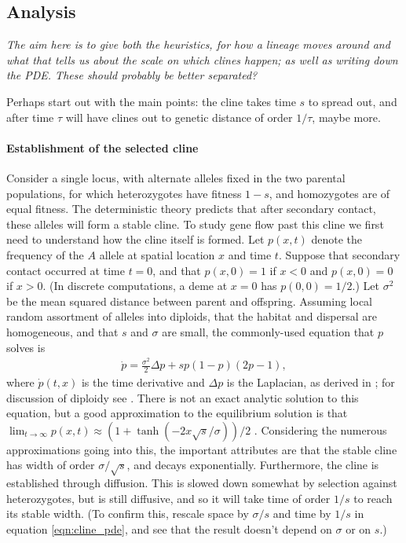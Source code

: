 \documentclass[12pt]{article}
\newcommand{\plr}[1]{{\em \color{blue} #1}}
\begin{document}
\subsection*{Analysis}

\plr{The aim here is to give both the heuristics, for how a lineage moves around
and what that tells us about the scale on which clines happen;
as well as writing down the PDE.  These should probably be better separated?}

Perhaps start out with the main points:
the cline takes time $s$ to spread out,
and after time $\tau$ will have clines out to genetic distance of order $1/\tau$,
maybe more.

\paragraph{Establishment of the selected cline}
Consider a single locus, with alternate alleles fixed in the two parental populations,
for which heterozygotes have fitness $1-s$, and homozygotes are of equal fitness.
The deterministic theory predicts that after secondary contact,
these alleles will form a stable cline.
To study gene flow past this cline we first need to understand how the cline itself is formed.
Let $p(x,t)$ denote the frequency of the $A$ allele at spatial location $x$ and time $t$.  
Suppose that secondary contact occurred at time $t=0$, 
and that $p(x,0) = 1$ if $x<0$ and $p(x,0)=0$ if $x>0$.
(In discrete computations, a deme at $x=0$ has $p(0,0)=1/2$.)
Let $\sigma^2$ be the mean squared distance between parent and offspring.
Assuming local random assortment of alleles into diploids,
that the habitat and dispersal are homogeneous,
and that $s$ and $\sigma$ are small, 
the commonly-used equation that $p$ solves is
\begin{align} \label{eqn:cline_pde}
    \dot p = \frac{\sigma^2}{2} \Delta p + s p (1-p) (2p-1) ,
\end{align}
where $\dot p(t,x)$ is the time derivative and $\Delta p$ is the Laplacian,
as derived in \citep{bazykin}; for discussion of diploidy see \citep{diploidcline}.
There is not an exact analytic solution to this equation, 
but a good approximation to the equilibrium solution is that
$\lim_{t \to \infty} p(x,t) \approx (1+\tanh(-2x\sqrt{s}/\sigma))/2$ \citep{bazykin}.
Considering the numerous approximations going into this,
the important attributes are that 
the stable cline has width of order $\sigma/\sqrt{s}$,
and decays exponentially.
Furthermore, the cline is established through diffusion.
This is slowed down somewhat by selection against heterozygotes,
but is still diffusive, and so it will take time of order $1/s$
to reach its stable width.
(To confirm this, 
rescale space by $\sigma/s$ and time by $1/s$ in equation \eqref{eqn:cline_pde},
and see that the result doesn't depend on $\sigma$ or on $s$.)
\end{document}
